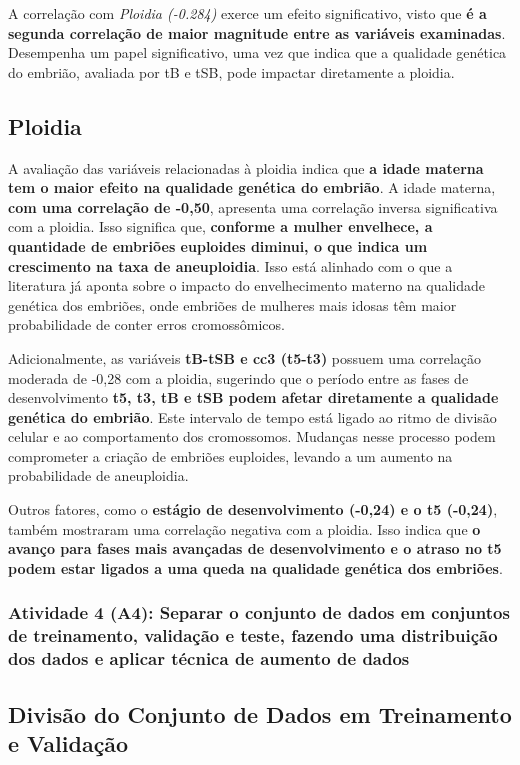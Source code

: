 A correlação com \textit{Ploidia (-0.284)} exerce um efeito significativo, visto que \textbf{é a segunda correlação de maior magnitude entre as variáveis examinadas}. Desempenha um papel significativo, uma vez que indica que a qualidade genética do embrião, avaliada por tB e tSB, pode impactar diretamente a ploidia. 

\subsection*{Ploidia}
A avaliação das variáveis relacionadas à ploidia indica que \textbf{a idade materna tem o maior efeito na qualidade genética do embrião}. A idade materna, \textbf{com uma correlação de -0,50}, apresenta uma correlação inversa significativa com a ploidia. Isso significa que, \textbf{conforme a mulher envelhece, a quantidade de embriões euploides diminui, o que indica um crescimento na taxa de aneuploidia}. Isso está alinhado com o que a literatura já aponta sobre o impacto do envelhecimento materno na qualidade genética dos embriões, onde embriões de mulheres mais idosas têm maior probabilidade de conter erros cromossômicos. 

Adicionalmente, as variáveis \textbf{tB-tSB e cc3 (t5-t3)} possuem uma correlação moderada de -0,28 com a ploidia, sugerindo que o período entre as fases de desenvolvimento \textbf{t5, t3, tB e tSB podem afetar diretamente a qualidade genética do embrião}. Este intervalo de tempo está ligado ao ritmo de divisão celular e ao comportamento dos cromossomos. Mudanças nesse processo podem comprometer a criação de embriões euploides, levando a um aumento na probabilidade de aneuploidia. 

Outros fatores, como o \textbf{estágio de desenvolvimento (-0,24) e o t5 (-0,24)}, também mostraram uma correlação negativa com a ploidia. Isso indica que \textbf{o avanço para fases mais avançadas de desenvolvimento e o atraso no t5 podem estar ligados a uma queda na qualidade genética dos embriões}. 

\subsubsection{Atividade 4 (A4): Separar o conjunto de dados em conjuntos de treinamento, validação e teste, fazendo uma distribuição dos dados e aplicar técnica de aumento de dados}

\subsection*{Divisão do Conjunto de Dados em Treinamento e Validação}

